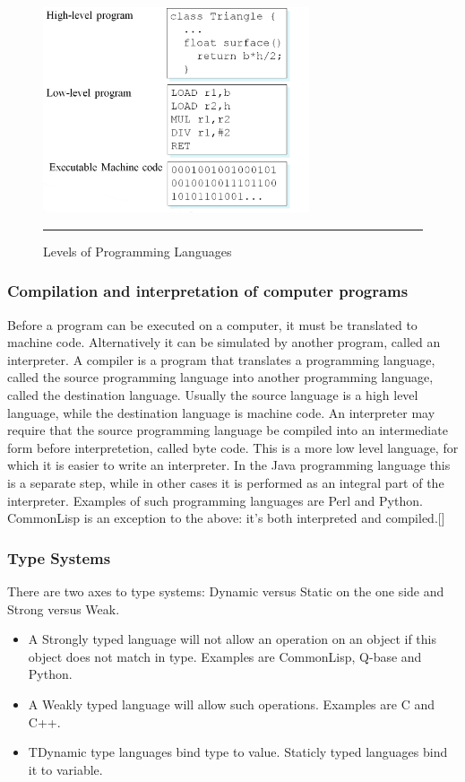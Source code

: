 \begin{figure}[h!]
	\centering
	\includegraphics[width=0.7\textwidth]{./images/lavels.jpg}
	\rule{0.7\textwidth}{1pt}
	\caption{Levels of Programming Languages}
\end{figure}
\subsubsection*{Compilation and interpretation of computer programs}

Before a program can be executed on a computer, it must be translated to machine code. Alternatively it can be simulated by another program, called an interpreter. A compiler is a program that translates a programming language, called the source programming language into another programming language, called the destination language. Usually the source language is a high level language, while the destination language is machine code. An interpreter may require that the source programming language be compiled into an intermediate form before interpretetion, called byte code. This is a more low level language, for which it is easier to write an interpreter. In the Java programming language this is a separate step, while in other cases it is performed as an integral part of the interpreter. Examples of such programming languages are Perl and Python. CommonLisp is an exception to the above: it's both interpreted and compiled.[\cite{6}]

\subsubsection*{Type Systems}
There are two axes to type systems: Dynamic versus Static on the one side and Strong versus Weak.

\begin{itemize}
	\item A Strongly typed language will not allow an operation on an object if this object does not match in type. Examples are CommonLisp, Q-base and Python.
	\item A Weakly typed language will allow such operations. Examples are C and C++.
	\item TDynamic type languages bind type to value. Staticly typed languages bind it to variable.
\end{itemize}


